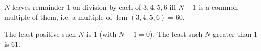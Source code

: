 $N$ leaves remainder $1$ on division by each of $3,4,5,6$ iff $N-1$ is a common multiple of them, i.e. a multiple of $\operatorname{lcm}(3,4,5,6)=60$.

The least positive such $N$ is $\boxed{1}$ (with $N-1=0$). The least such $N$ greater than $1$ is $\boxed{61}$.
